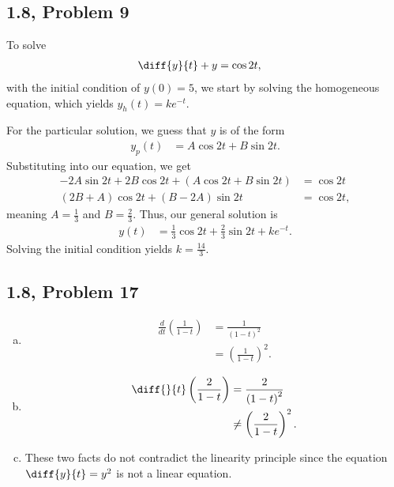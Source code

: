 \documentclass[10pt]{mypackage}
\begin{document}
\subsection{1.8, Problem 9}%
To solve
\begin{align*}
  \diff{y}{t} + y &= \cos 2t,
\end{align*}
with the initial condition of $y(0) = 5$, we start by solving the homogeneous equation, which yields $y_h(t) = ke^{-t}$.\newline

For the particular solution, we guess that $y$ is of the form
\begin{align*}
  y_p(t) &= A\cos 2t + B\sin 2t.
\end{align*}
Substituting into our equation, we get
\begin{align*}
  -2A\sin 2t + 2B\cos 2t + \left(A\cos 2t + B\sin 2t\right) &= \cos 2t\\
  \left(2B + A\right)\cos 2t + \left(B - 2A\right)\sin 2t &= \cos 2t,
\end{align*}
meaning $A = \frac{1}{3}$ and $B = \frac{2}{3}$. Thus, our general solution is
\begin{align*}
  y(t) &= \frac{1}{3}\cos 2t + \frac{2}{3}\sin 2t + ke^{-t}.
\end{align*}
Solving the initial condition yields $k = \frac{14}{3}$.
\subsection{1.8, Problem 17}%
\begin{enumerate}[(a)]
  \item 
    \begin{align*}
      \frac{d}{dt}\left(\frac{1}{1-t}\right) &= \frac{1}{\left(1-t\right)^2}\\
                                             &= \left(\frac{1}{1-t}\right)^2.
    \end{align*}
  \item 
    \begin{align*}
      \diff{}{t}\left(\frac{2}{1-t}\right) &= \frac{2}{\left(1-t\right)^2}\\
                                           &\neq \left(\frac{2}{1-t}\right)^2.
    \end{align*}
  \item These two facts do not contradict the linearity principle since the equation $\diff{y}{t} = y^2$ is not a linear equation.
\end{enumerate}
\end{document}
